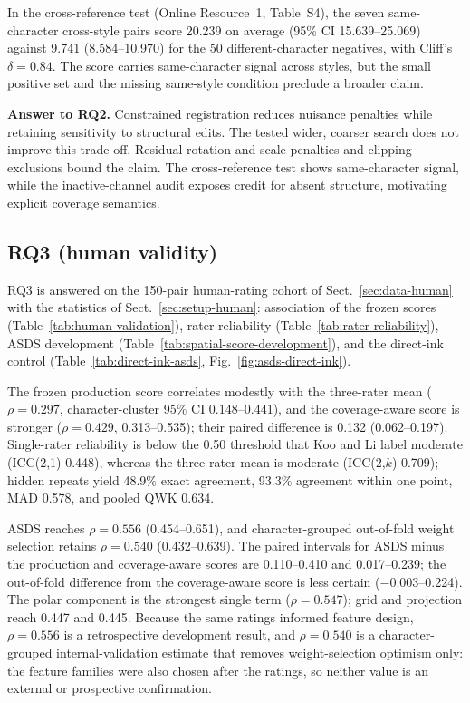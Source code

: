 In the cross-reference test (Online Resource~1, Table~S4), the seven
same-character cross-style pairs score 20.239 on average (95\% CI 15.639--25.069) against 9.741
(8.584--10.970) for the 50 different-character negatives, with Cliff's
\(\delta=0.84\). The score carries same-character signal across styles, but the small
positive set and the missing same-style condition preclude a broader claim.

\medskip
\noindent\textbf{Answer to RQ2.}
Constrained registration reduces nuisance penalties while retaining
sensitivity to structural edits. The tested wider, coarser search does not
improve this trade-off. Residual rotation and scale penalties and clipping
exclusions bound the claim. The cross-reference test shows same-character
signal, while the inactive-channel audit exposes credit for absent
structure, motivating explicit coverage semantics.

\subsection{RQ3 (human validity)}
\label{sec:rq3}

RQ3 is answered on the 150-pair human-rating cohort of
Sect.~\ref{sec:data-human} with the statistics of
Sect.~\ref{sec:setup-human}: association of the frozen scores
(Table~\ref{tab:human-validation}), rater reliability
(Table~\ref{tab:rater-reliability}), ASDS development
(Table~\ref{tab:spatial-score-development}), and the direct-ink control
(Table~\ref{tab:direct-ink-asds}, Fig.~\ref{fig:asds-direct-ink}).




The frozen production score correlates modestly with the three-rater mean
(\(\rho=0.297\), character-cluster 95\% CI 0.148--0.441), and the
coverage-aware score is stronger (\(\rho=0.429\), 0.313--0.535); their
paired difference is 0.132 (0.062--0.197). Single-rater reliability is below the 0.50 threshold that Koo and Li
\cite{koo2016icc} label moderate (ICC(2,1) 0.448), whereas the three-rater
mean is moderate (ICC(2,\(k\)) 0.709); hidden repeats yield
48.9\% exact agreement, 93.3\% agreement within one point, MAD 0.578, and
pooled QWK 0.634.



ASDS reaches \(\rho=0.556\) (0.454--0.651), and character-grouped
out-of-fold weight selection retains \(\rho=0.540\) (0.432--0.639). The
paired intervals for ASDS minus the production and coverage-aware scores are
0.110--0.410 and 0.017--0.239; the out-of-fold difference from the
coverage-aware score is less certain (\(-0.003\)--0.224). The polar component
is the strongest single term (\(\rho=0.547\)); grid and projection reach
0.447 and 0.445. Because the same ratings informed feature design, \(\rho=0.556\) is a
retrospective development result, and \(\rho=0.540\) is a
character-grouped internal-validation estimate that removes
weight-selection optimism only: the feature families were also chosen after
the ratings, so neither value is an external or prospective confirmation.


